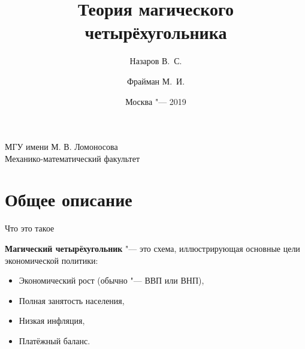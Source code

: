 \documentclass{beamer}
\begin{document}
\title{{Теория магического четырёхугольника}}
\author[%
	Назаров В.\ С. \and Фрайман М.\ И.
]{%
	\scriptsize
	Назаров В.\ С. \and Фрайман М.\ И.
}
\date{\footnotesize{Москва "--- 2019}}


	\begin{frame}
		\begin{center}
			\footnotesize{МГУ имени М. В. Ломоносова}\\
			\footnotesize{Механико-математический факультет}\\\vspace{10pt}
		\end{center}
		\titlepage
	\end{frame}

	\section{Общее описание}

	\begin{frame}{Что это такое}
	
		\textbf{Магический четырёхугольник} "--- это схема, иллюстрирующая основные цели экономической политики:
		\begin{itemize}
			\item Экономический рост (обычно "--- ВВП или ВНП),
			\item Полная занятость населения,
			\item Низкая инфляция,
			\item Платёжный баланс.
		\end{itemize}
		
	\end{frame}
	
\end{document}
